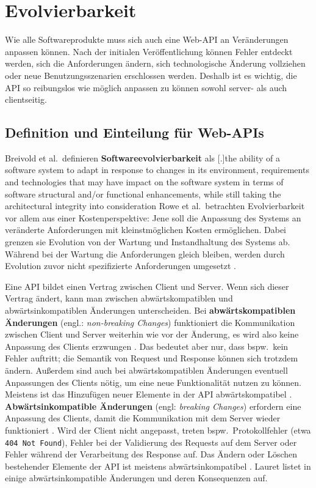 \section{Evolvierbarkeit}\label{sec:comp-criteria|evolvability}

Wie alle Softwareprodukte muss sich auch eine Web-API an Veränderungen anpassen können. Nach der initialen Veröffentlichung können Fehler entdeckt werden, sich die Anforderungen ändern, sich technologische Änderung vollziehen oder neue Benutzungsszenarien erschlossen werden. Deshalb ist es wichtig, die API so reibungslos wie möglich anpassen zu können \textendash{} sowohl server- als auch clientseitig.

\subsection{Definition und Einteilung für Web-APIs}
\para{}Breivold et al.\ definieren \textbf{Softwareevolvierbarkeit} als [.]{the ability of a software system to adapt in response to changes in its environment, requirements and technologies that may have impact on the software system in terms of software structural and/or functional enhancements, while still taking the architectural integrity into consideration} Rowe et al.\ betrachten Evolvierbarkeit vor allem aus einer Kostenperspektive: Jene soll die Anpassung des Systems an veränderte Anforderungen mit kleinstmöglichen Kosten ermöglichen. Dabei grenzen sie Evolution von der Wartung und Instandhaltung des Systems ab. Während bei der Wartung die Anforderungen gleich bleiben, werden durch Evolution zuvor nicht spezifizierte Anforderungen umgesetzt \autocite{Rowe1998}.

\para{}Eine API bildet einen Vertrag zwischen Client und Server. Wenn sich dieser Vertrag ändert, kann man zwischen abwärtskompatiblen und abwärtsinkompatiblen Änderungen unterscheiden. Bei \textbf{abwärtskompatiblen Änderungen} (engl.: \textit{non-breaking Changes}) funktioniert die Kommunikation zwischen Client und Server weiterhin wie vor der Änderung, es wird also keine Anpassung des Clients erzwungen \autocite[S.~215]{Lauret2019}. Das bedeutet aber nur, dass bspw.\ kein Fehler auftritt; die Semantik von Request und Response können sich trotzdem ändern. Außerdem sind auch bei abwärtskompatiblen Änderungen eventuell Anpassungen des Clients nötig, um eine neue Funktionalität nutzen zu können. Meistens ist das Hinzufügen neuer Elemente in der API abwärtskompatibel \autocite{Xavier2017}. \textbf{Abwärtsinkompatible Änderungen} (engl: \textit{breaking Changes}) erfordern eine Anpassung des Clients, damit die Kommunikation mit dem Server wieder funktioniert \autocite[S.~215]{Lauret2019}. Wird der Client nicht angepasst, treten bspw.\ Protokollfehler (etwa \texttt{404 Not Found}), Fehler bei der Validierung des Requests auf dem Server oder Fehler während der Verarbeitung des Response auf. Das Ändern oder Löschen bestehender Elemente der API ist meistens abwärtsinkompatibel \autocite{Xavier2017}. Lauret listet in \autocite[Kap.~9]{Lauret2019} einige abwärtsinkompatible Änderungen und deren Konsequenzen auf.

